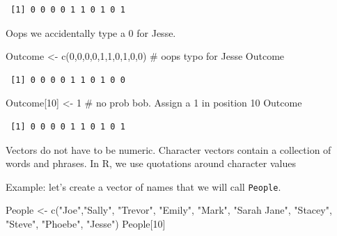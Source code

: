 \documentclass[
  letterpaper,
  DIV=11,
  numbers=noendperiod]{scrreprt}
\newenvironment{Shaded}{\begin{snugshade}}{\end{snugshade}}
\newcommand{\CommentTok}[1]{\textcolor[rgb]{0.37,0.37,0.37}{#1}}
\newcommand{\DecValTok}[1]{\textcolor[rgb]{0.68,0.00,0.00}{#1}}
\newcommand{\FunctionTok}[1]{\textcolor[rgb]{0.28,0.35,0.67}{#1}}
\newcommand{\NormalTok}[1]{\textcolor[rgb]{0.00,0.23,0.31}{#1}}
\newcommand{\OtherTok}[1]{\textcolor[rgb]{0.00,0.23,0.31}{#1}}
\newcommand{\StringTok}[1]{\textcolor[rgb]{0.13,0.47,0.30}{#1}}
\begin{document}
\begin{verbatim}
 [1] 0 0 0 0 1 1 0 1 0 1
\end{verbatim}

Oops we accidentally type a 0 for Jesse.

\begin{Shaded}
\begin{Highlighting}[]
\NormalTok{Outcome }\OtherTok{\textless{}{-}} \FunctionTok{c}\NormalTok{(}\DecValTok{0}\NormalTok{,}\DecValTok{0}\NormalTok{,}\DecValTok{0}\NormalTok{,}\DecValTok{0}\NormalTok{,}\DecValTok{1}\NormalTok{,}\DecValTok{1}\NormalTok{,}\DecValTok{0}\NormalTok{,}\DecValTok{1}\NormalTok{,}\DecValTok{0}\NormalTok{,}\DecValTok{0}\NormalTok{) }\CommentTok{\# oops typo for Jesse}
\NormalTok{Outcome}
\end{Highlighting}
\end{Shaded}

\begin{verbatim}
 [1] 0 0 0 0 1 1 0 1 0 0
\end{verbatim}

\begin{Shaded}
\begin{Highlighting}[]
\NormalTok{Outcome[}\DecValTok{10}\NormalTok{] }\OtherTok{\textless{}{-}} \DecValTok{1} \CommentTok{\# no prob bob. Assign a 1 in position 10}
\NormalTok{Outcome}
\end{Highlighting}
\end{Shaded}

\begin{verbatim}
 [1] 0 0 0 0 1 1 0 1 0 1
\end{verbatim}

Vectors do not have to be numeric. Character vectors contain a
collection of words and phrases. In R, we use quotations around
character values

Example: let's create a vector of names that we will call
\texttt{People}.

\begin{Shaded}
\begin{Highlighting}[]
\NormalTok{People }\OtherTok{\textless{}{-}} \FunctionTok{c}\NormalTok{(}\StringTok{"Joe"}\NormalTok{,}\StringTok{"Sally"}\NormalTok{, }\StringTok{"Trevor"}\NormalTok{, }\StringTok{"Emily"}\NormalTok{, }\StringTok{"Mark"}\NormalTok{, }\StringTok{"Sarah Jane"}\NormalTok{, }\StringTok{"Stacey"}\NormalTok{, }\StringTok{"Steve"}\NormalTok{, }\StringTok{"Phoebe"}\NormalTok{, }\StringTok{"Jesse"}\NormalTok{)}
\NormalTok{People[}\DecValTok{10}\NormalTok{]}
\end{Highlighting}
\end{Shaded}
\end{document}
